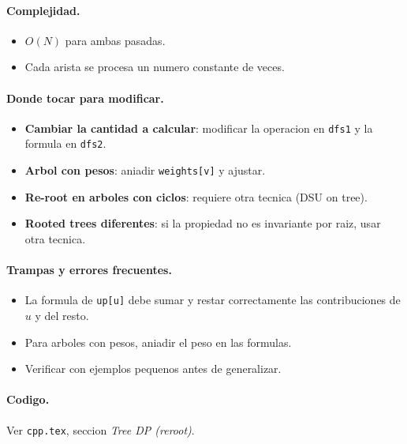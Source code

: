 \paragraph{Complejidad.}
\begin{itemize}\setlength\itemsep{0pt}
	\item $O(N)$ para ambas pasadas.
	\item Cada arista se procesa un numero constante de veces.
\end{itemize}

\paragraph{Donde tocar para modificar.}
\begin{itemize}\setlength\itemsep{0pt}
	\item \textbf{Cambiar la cantidad a calcular}: modificar la operacion en \texttt{dfs1} y la formula en \texttt{dfs2}.
	\item \textbf{Arbol con pesos}: aniadir \texttt{weights[v]} y ajustar.
	\item \textbf{Re-root en arboles con ciclos}: requiere otra tecnica (DSU on tree).
	\item \textbf{Rooted trees diferentes}: si la propiedad no es invariante por raiz, usar otra tecnica.
\end{itemize}

\paragraph{Trampas y errores frecuentes.}
\begin{itemize}\setlength\itemsep{0pt}
	\item La formula de \texttt{up[u]} debe sumar y restar correctamente las contribuciones de $u$ y del resto.
	\item Para arboles con pesos, aniadir el peso en las formulas.
	\item Verificar con ejemplos pequenos antes de generalizar.
\end{itemize}

\paragraph{Codigo.}
Ver \texttt{cpp.tex}, seccion \textit{Tree DP (reroot)}.
